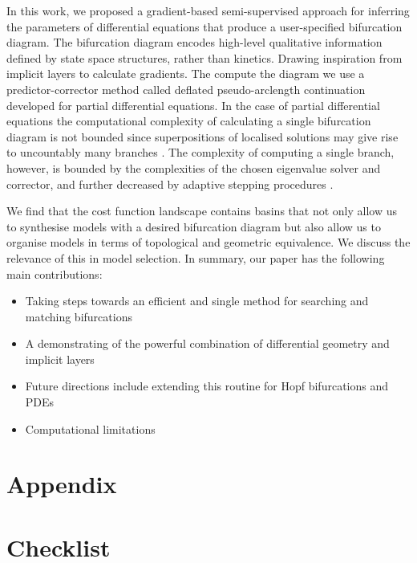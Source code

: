 In this work, we proposed a gradient-based semi-supervised approach for inferring the parameters of differential equations that produce a user-specified bifurcation diagram. The bifurcation diagram encodes high-level qualitative information defined by state space structures, rather than kinetics. Drawing inspiration from implicit layers \cite{Look2020DifferentiableLayers,Bai2019DeepModels} to calculate gradients. The compute the diagram we use a predictor-corrector method called deflated pseudo-arclength continuation \cite{Farrell2016TheDiagrams,Veltz2019PseudoArcLengthContinuation.jl} developed for partial differential equations. In the case of partial differential equations the computational complexity of calculating a single bifurcation diagram is not bounded since superpositions of localised solutions may give rise to uncountably many branches \cite{Avitabile2010ToEquation}. The complexity of computing a single branch, however, is bounded by the complexities of the chosen eigenvalue solver and corrector, and further decreased by adaptive stepping procedures \cite{Aruliah2016AlgorithmContinuation}.

We find that the cost function landscape contains basins that not only allow us to synthesise models with a desired bifurcation diagram but also allow us to organise models in terms of topological and geometric equivalence. We discuss the relevance of this in model selection. In summary, our paper has the following main contributions:

\begin{itemize}
    \item Taking steps towards an efficient and single method for searching and matching bifurcations
    \item A demonstrating of the powerful combination of differential geometry and implicit layers
    \item Future directions include extending this routine for Hopf bifurcations and PDEs
    \item Computational limitations
\end{itemize}

\clearpage



\clearpage
\section*{Appendix}
\appendix


\clearpage
\section*{Checklist}


